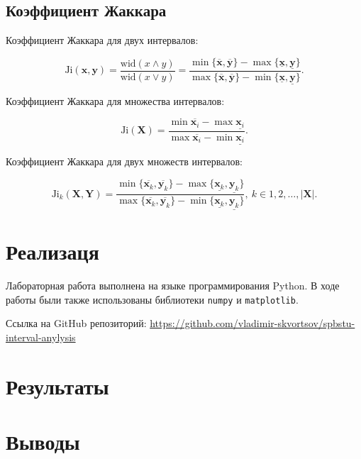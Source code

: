\documentclass{article}
\begin{document}
  \subsection{Коэффициент Жаккара}

  Коэффициент Жаккара для двух интервалов:

  \begin{equation}
    \text{Ji} (\mathbf{x}, \mathbf{y})
      = \frac{\text{wid} (x \land y)}{\text{wid} (x \lor y)}
      = \frac{\min \{ \overline{\mathbf{x}}, \overline{\mathbf{y}} \} - \max \{ \underline{\mathbf{x}}, \underline{\mathbf{y}} \}}
        {\max\{ \overline{\mathbf{x}}, \overline{\mathbf{y}} \} - \min \{ \underline{\mathbf{x}}, \underline{\mathbf{y}} \}}.
  \end{equation}

  Коэффициент Жаккара для множества интервалов:

  \begin{equation}
    \text{Ji} (\mathbf{X})
      = \frac{\min \overline{\mathbf{x}_i} - \max \underline{\mathbf{x}_i}}
        {\max \overline{\mathbf{x}_i} - \min \underline{\mathbf{x}_i}}.
  \end{equation}

  Коэффициент Жаккара для двух множеств интервалов:

  \begin{equation}
    \text{Ji}_k (\mathbf{X}, \mathbf{Y})
      = \frac{\min \{ \overline{\mathbf{x}_k}, \overline{\mathbf{y}_k} \} - \max \{ \underline{\mathbf{x}_k}, \underline{\mathbf{y}_k} \}}
        {\max\{ \overline{\mathbf{x}_k}, \overline{\mathbf{y}_k} \} - \min \{ \underline{\mathbf{x}_k}, \underline{\mathbf{y}_k} \}},
      \ k \in 1, 2, \dots, |\mathbf{X}|.
  \end{equation}

  \section{Реализаця}

  Лабораторная работа выполнена на языке программирования Python. В ходе
  работы были также использованы библиотеки \verb!numpy! и
  \verb!matplotlib!.

  Ссылка на GitHub репозиторий:
  \href{https://github.com/vladimir-skvortsov/spbstu-interval-anylysis}
  {https://github.com/vladimir-skvortsov/spbstu-interval-anylysis}

  \clearpage

  \section{Результаты}

  \section{Выводы}
\end{document}
